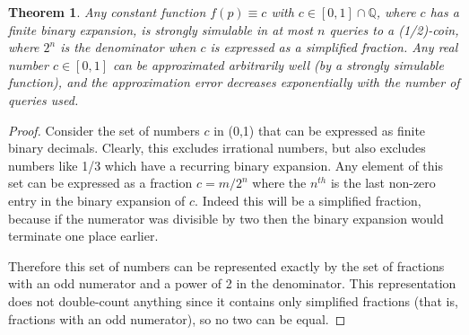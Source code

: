 \documentclass{article}
\newtheorem{thm}{Theorem}
\theoremstyle{definition}
\begin{document}
\begin{thm}
Any constant function $f(p)\equiv c$ with $c \in [0,1]\cap\mathbb{Q}$, where $c$ has a finite binary expansion, is strongly simulable in at most $n$ queries to a (1/2)-coin, where $2^n$ is the denominator when $c$ is expressed as a simplified fraction.
Any real number $c \in [0,1]$ can be approximated arbitrarily well (by a strongly simulable function), and the approximation error decreases exponentially with the number of queries used.
\end{thm}
\begin{proof}
Consider the set of numbers $c$ in (0,1) that can be expressed as finite binary decimals. Clearly, this excludes irrational numbers, but also excludes numbers like 1/3 which have a recurring binary expansion. Any element of this set can be expressed as a fraction $c = m/2^n$ where the $n^{th}$ is the last non-zero entry in the binary expansion of $c$. Indeed this will be a simplified fraction, because if the numerator was divisible by two then the binary expansion would terminate one place earlier.

Therefore this set of numbers can be represented exactly by the set of fractions with an odd numerator and a power of 2 in the denominator. This representation does not double-count anything since it contains only simplified fractions (that is, fractions with an odd numerator), so no two can be equal.


\end{proof}
\end{document}
